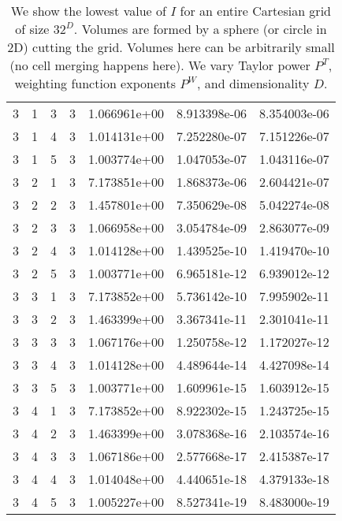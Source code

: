\documentclass{article}
\begin{document}
\begin{small}
\begin{table}
\begin{center}
\begin{tabular}{|cccc|ccc|}
3 & 1 & 3 & 3 & 1.066961e+00 & 8.913398e-06 & 8.354003e-06 \\ 
3 & 1 & 4 & 3 & 1.014131e+00 & 7.252280e-07 & 7.151226e-07 \\ 
3 & 1 & 5 & 3 & 1.003774e+00 & 1.047053e-07 & 1.043116e-07 \\ 
3 & 2 & 1 & 3 & 7.173851e+00 & 1.868373e-06 & 2.604421e-07 \\ 
3 & 2 & 2 & 3 & 1.457801e+00 & 7.350629e-08 & 5.042274e-08 \\ 
3 & 2 & 3 & 3 & 1.066958e+00 & 3.054784e-09 & 2.863077e-09 \\ 
3 & 2 & 4 & 3 & 1.014128e+00 & 1.439525e-10 & 1.419470e-10 \\ 
3 & 2 & 5 & 3 & 1.003771e+00 & 6.965181e-12 & 6.939012e-12 \\ 
3 & 3 & 1 & 3 & 7.173852e+00 & 5.736142e-10 & 7.995902e-11 \\ 
3 & 3 & 2 & 3 & 1.463399e+00 & 3.367341e-11 & 2.301041e-11 \\ 
3 & 3 & 3 & 3 & 1.067176e+00 & 1.250758e-12 & 1.172027e-12 \\ 
3 & 3 & 4 & 3 & 1.014128e+00 & 4.489644e-14 & 4.427098e-14 \\ 
3 & 3 & 5 & 3 & 1.003771e+00 & 1.609961e-15 & 1.603912e-15 \\ 
3 & 4 & 1 & 3 & 7.173852e+00 & 8.922302e-15 & 1.243725e-15 \\ 
3 & 4 & 2 & 3 & 1.463399e+00 & 3.078368e-16 & 2.103574e-16 \\ 
3 & 4 & 3 & 3 & 1.067186e+00 & 2.577668e-17 & 2.415387e-17 \\ 
3 & 4 & 4 & 3 & 1.014048e+00 & 4.440651e-18 & 4.379133e-18 \\ 
3 & 4 & 5 & 3 & 1.005227e+00 & 8.527341e-19 & 8.483000e-19 \\
\hline
\end{tabular}
\end{center}
\label{tab::worst_unmerged_inv_conv}
\caption
    {
      We show the lowest value of
      $I$ for an entire Cartesian grid of size $32^D$.
      Volumes are  formed by a sphere (or circle in 2D) cutting the
      grid.   Volumes here can be arbitrarily small (no cell merging
      happens here).
      We vary Taylor power $P^T$, weighting
      function exponents $P^W$, and dimensionality $D$. 
    }
\end{table}
\end{small}
\end{document}
